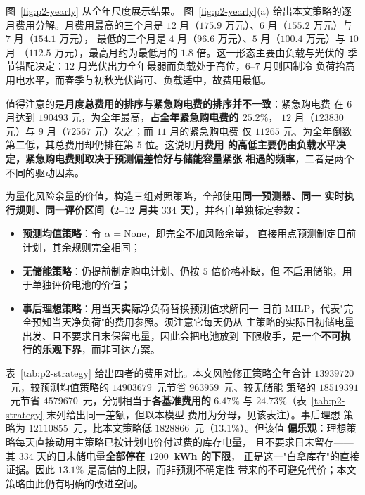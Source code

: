 图~\ref{fig:p2-yearly} 从全年尺度展示结果。
图~\ref{fig:p2-yearly}(a) 给出本文策略的逐月费用分解。月费用最高的三个月是
$12$ 月（$175.9$ 万元）、$6$ 月（$155.2$ 万元）与 $7$ 月（$154.1$ 万元），
最低的三个月是 $4$ 月（$96.6$ 万元）、$5$ 月（$100.4$ 万元）与 $10$ 月
（$112.5$ 万元），最高月约为最低月的 $1.8$ 倍。这一形态主要由负载与光伏的
季节错配决定：$12$ 月光伏出力全年最弱而负载处于高位，$6$--$7$ 月则因制冷
负荷抬高用电水平，而春季与初秋光伏尚可、负载适中，故费用最低。

值得注意的是\textbf{月度总费用的排序与紧急购电费的排序并不一致}：紧急购电费
在 $6$ 月达到 $190493$ 元，为全年最高，\textbf{占全年紧急购电费的 $25.2\%$}，
$12$ 月（$123830$ 元）与 $9$ 月（$72567$ 元）次之；而 $11$ 月的紧急购电费
仅 $11265$ 元、为全年倒数第二低，其总费用却仍排在第 $5$ 位。这说明\textbf{月费用
的高低主要仍由负载水平决定，紧急购电费则取决于预测偏差恰好与储能容量紧张
相遇的频率}，二者是两个不同的驱动因素。

为量化风险余量的价值，构造三组对照策略，全部使用\textbf{同一预测器、同一
实时执行规则、同一评价区间（$2$--$12$ 月共 $334$ 天）}，并各自单独标定参数：

\begin{itemize}
  \item \textbf{预测均值策略}：令 $\alpha=\text{None}$，即完全不加风险余量，
        直接用点预测制定日前计划，其余规则完全相同；
  \item \textbf{无储能策略}：仍提前制定购电计划、仍按 $5$ 倍价格补缺，但
        不启用储能，用于单独评价电池的价值；
  \item \textbf{事后理想策略}：用当天\textbf{实际}净负荷替换预测值求解同一
        日前 MILP，代表"完全预知当天净负荷"的费用参照。须注意它每天仍从
        主策略的实际日初储电量出发、且不要求日末保留电量，因此会把电池放到
        下限收手，是一个\textbf{不可执行的乐观下界}，而非可达方案。
\end{itemize}

表~\ref{tab:p2-strategy} 给出四者的费用对比。本文风险修正策略全年合计
$13939720$~元，较预测均值策略的 $14903679$~元节省 $963959$~元、较无储能
策略的 $18519391$~元节省 $4579670$~元，分别相当于\textbf{各基准费用的}
$6.47\%$ 与 $24.73\%$（表~\ref{tab:p2-strategy} 末列给出同一差额，但以本模型
费用为分母，见该表注）。事后理想
策略为 $12110855$~元，比本文策略低 $1828866$~元（$13.1\%$）。但该值
\textbf{偏乐观}：理想策略每天直接动用主策略已按计划电价付过费的库存电量，
且不要求日末留存——其 $334$ 天的日末储电量\textbf{全部停在 $1200$~kWh 的下限}，
正是这一"白拿库存"的直接证据。因此 $13.1\%$ 是高估的上限，而非预测不确定性
带来的不可避免代价；本文策略由此仍有明确的改进空间。

